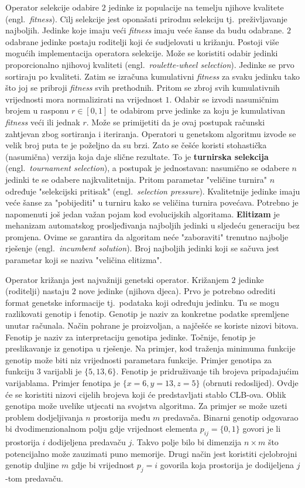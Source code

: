 \documentclass[times, utf8, diplomski]{fer}
\begin{document}
Operator selekcije odabire $2$ jedinke iz populacije na temelju njihove kvalitete (engl.~\textit{fitness}). Cilj selekcije jest oponašati prirodnu selekciju tj.~preživljavanje najboljih. Jedinke koje imaju veći \textit{fitness} imaju veće šanse da budu odabrane. $2$ odabrane jedinke postaju roditelji koji će sudjelovati u križanju. Postoji više mogućih implementacija operatora selekcije. Može se koristiti odabir jedinki proporcionalno njihovoj kvaliteti (engl.~\textit{roulette-wheel selection}). Jedinke se prvo sortiraju po kvaliteti. Zatim se izračuna kumulativni \textit{fitness} za svaku jedinku tako što joj se pribroji \textit{fitness} svih prethodnih. Pritom se zbroj svih kumulativnih vrijednosti mora normalizirati na vrijednost $1$. Odabir se izvodi nasumičnim brojem u rasponu $r \in [0, 1]$ te odabirom prve jedinke za koju je kumulativan \textit{fitness} veći ili jednak $r$. Može se primijetiti da je ovaj postupak računski zahtjevan zbog sortiranja i iteriranja. Operatori u genetskom algoritmu izvode se velik broj puta te je poželjno da su brzi. Zato se češće koristi stohastička (nasumična) verzija koja daje slične rezultate. To je \textbf{turnirska selekcija} (engl.~\textit{tournament selection}), a postupak je jednostavan: nasumično se odabere $n$ jedinki te se odabere najkvalitetnija. Pritom parametar "veličine turnira" $n$ određuje "selekcijski pritisak" (engl.~\textit{selection pressure}).  Kvalitetnije jedinke imaju veće šanse za "pobijediti" u turniru kako se veličina turnira povećava. Potrebno je napomenuti još jedan važan pojam kod evolucijskih algoritama. \textbf{Elitizam} je mehanizam automatskog prosljeđivanja najboljih jedinki u sljedeću generaciju bez promjena. Ovime se garantira da algoritam neće "zaboraviti" trenutno najbolje rješenje (engl.~\textit{incumbent solution}). Broj najboljih jedinki koji se sačuva jest parametar koji se naziva "veličina elitizma".

Operator križanja jest najvažniji genetski operator. Križanjem $2$ jedinke (roditelji) nastaju $2$ nove jedinke (njihova djeca). Prvo je potrebno odrediti format genetske informacije tj.~podataka koji određuju jedinku. Tu se mogu razlikovati genotip i fenotip. Genotip je naziv za konkretne podatke spremljene unutar računala. Način pohrane je proizvoljan, a najčešće se koriste nizovi bitova. Fenotip je naziv za interpretaciju genotipa jedinke. Točnije, fenotip je preslikavanje iz genotipa u rješenje. Na primjer, kod traženja minimuma funkcije genotip može biti niz vrijednosti parametara funkcije. Primjer genotipa za funkciju $3$ varijabli je $\{5, 13, 6\}$. Fenotip je pridruživanje tih brojeva pripadajućim varijablama. Primjer fenotipa je $\{x=6, y=13, z=5\}$ (obrnuti redoslijed). Ovdje će se koristiti nizovi cijelih brojeva koji će predstavljati stablo CLB-ova. Oblik genotipa može uvelike utjecati na svojstva algoritma. Za primjer se može uzeti problem dodjeljivanja $n$ prostorija među $m$ predavača. Binarni genotip odgovarao bi dvodimenzionalnom polju gdje vrijednost elementa $p_{ij}=\{0, 1\}$ govori je li prostorija $i$ dodijeljena predavaču $j$. Takvo polje bilo bi dimenzija $n \times m$ što potencijalno može zauzimati puno memorije. Drugi način jest koristiti cjelobrojni genotip duljine $m$ gdje bi vrijednost $p_{j}=i$ govorila koja prostorija je dodijeljena $j$-tom predavaču.
\end{document}
